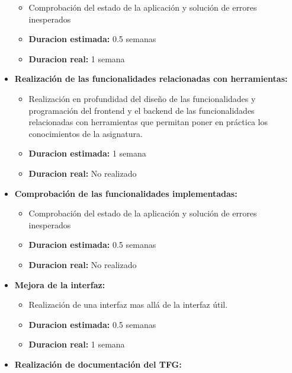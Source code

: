 \documentclass[openright,twoside,10pt]{book}
\providecommand{\tightlist}{%
  \setlength{\itemsep}{0pt}\setlength{\parskip}{0pt}}
\begin{document}
\begin{itemize}
      \begin{itemize}
      \tightlist
      \item
        Comprobación del estado de la aplicación y solución de errores
        inesperados
      \item
        \textbf{Duracion estimada:} 0.5 semanas
      \item
        \textbf{Duracion real:} 1 semana
      \end{itemize}
    \item
      \textbf{Realización de las funcionalidades relacionadas con
      herramientas:}
    
      \begin{itemize}
      \tightlist
      \item
        Realización en profundidad del diseño de las funcionalidades y
        programación del frontend y el backend de las funcionalidades
        relacionadas con herramientas que permitan poner en práctica los
        conocimientos de la asignatura.
      \item
        \textbf{Duracion estimada:} 1 semana
      \item
        \textbf{Duracion real:} No realizado
      \end{itemize}
    \item
      \textbf{Comprobación de las funcionalidades implementadas:}
    
      \begin{itemize}
      \tightlist
      \item
        Comprobación del estado de la aplicación y solución de errores
        inesperados
      \item
        \textbf{Duracion estimada:} 0.5 semanas
      \item
        \textbf{Duracion real:} No realizado
      \end{itemize}
    \item
      \textbf{Mejora de la interfaz:}
    
      \begin{itemize}
      \tightlist
      \item
        Realización de una interfaz mas allá de la interfaz útil.
      \item
        \textbf{Duracion estimada:} 0.5 semanas
      \item
        \textbf{Duracion real:} 1 semana
      \end{itemize}
    \item
      \textbf{Realización de documentación del TFG:}
    

\end{itemize}
\end{document}
